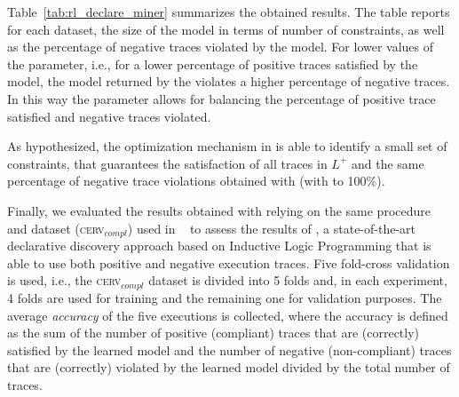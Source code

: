 Table~\ref{tab:rl_declare_miner} summarizes the obtained results. The table reports for each dataset, the size of the model in terms of number of constraints, as well as the percentage of negative traces violated by the model. For lower values of the  parameter, i.e., for a lower percentage of positive traces satisfied by the model, the model returned by the \declareminer violates a higher percentage of negative traces. In this way the  parameter allows for balancing the percentage of positive trace satisfied and negative traces violated. 

As hypothesized, the optimization mechanism in \nd is able to identify a small set of constraints, that guarantees the satisfaction of all traces in $L^+$ and the same percentage of negative trace violations obtained with \declareminer (with  to 100\%).

\begin{table} [ht]
	\centering
		\caption{\declareminer results}
		\label{tab:rl_declare_miner}
\end{table}

Finally, we evaluated the results obtained with \nd relying on the same procedure and dataset (\textsc{cerv$_{compl}$}) used in ~\cite{2007b-Lamma} to assess the results of \decminer, a state-of-the-art declarative discovery approach based on Inductive Logic Programming that is able to use both positive and negative execution traces. 
Five fold-cross validation is used, i.e., the \textsc{cerv$_{compl}$} dataset is divided into 5 folds and, in each experiment, 4 folds are used for training and the remaining one for validation purposes. The average \emph{accuracy} of the five executions is collected, where the accuracy is defined as the sum of the number of positive (compliant) traces that are (correctly) satisfied by the learned model and the number of negative (non-compliant) traces that are (correctly) violated by the learned model divided by the total number of traces. 

